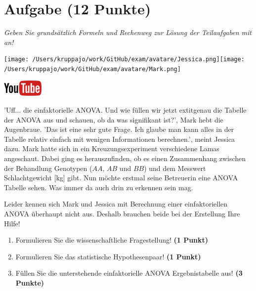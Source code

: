 \documentclass[a4paper, 9pt]{scrartcl}\usepackage[]{graphicx}\usepackage[]{xcolor}
\begin{document}
 
\clearpage

\section{Aufgabe \hfill (12 Punkte)}

\textit{Geben Sie grundsätzlich Formeln und Rechenweg zur Lösung der Teilaufgaben mit an!} \\[1Ex]
 

 
\begin{minipage}[t]{0.5\textwidth}
\texttt{[image: /Users/kruppajo/work/GitHub/exam/avatare/Jessica.png]}\hspace{-4mm}\texttt{[image: /Users/kruppajo/work/GitHub/exam/avatare/Mark.png]}
\end{minipage}
\begin{minipage}[t]{0.5\textwidth}
\hfill
\href{https://youtu.be/49hvImMwVyE}{\includegraphics[width = 2cm]{img/youtube}}
\end{minipage}
\vspace{1ex}



'Uff... die einfaktorielle ANOVA. Und wie füllen wir jetzt 	extit{genau} die Tabelle der ANOVA aus und schauen, ob da was signifikant ist?', Mark hebt die Augenbraue. 'Das ist eine sehr gute Frage. Ich glaube man kann alles in der Tabelle relativ einfach mit wenigen Informationen berechnen.', meint Jessica dazu. Mark hatte sich in ein Kreuzungsexperiment verschiedene Lamas angeschaut. Dabei ging es herauszufinden, ob es einen Zusammenhang zwischen der Behandlung Genotypen ($AA$, $AB$ und $BB$) und dem Messwert Schlachtgewicht [kg] gibt. Nun möchte erstmal seine Betreuerin eine ANOVA Tabelle sehen. Was immer da auch drin zu erkennen sein mag.



\vspace{1ex}

Leider kennen sich Mark und Jessica mit Berechnung einer einfaktoriellen ANOVA überhaupt nicht aus. Deshalb brauchen beide bei der Erstellung Ihre Hilfe! 

\begin{enumerate}
  \item Formulieren Sie die wissenschaftliche Fragestellung! \textbf{(1 Punkt)}
  \item Formulieren Sie das statistische Hypothesenpaar! \textbf{(1 Punkt)}
\item Füllen Sie die unterstehende einfaktorielle ANOVA Ergebnistabelle aus! \textbf{(3 Punkte)}
\end{enumerate}
\end{document}
